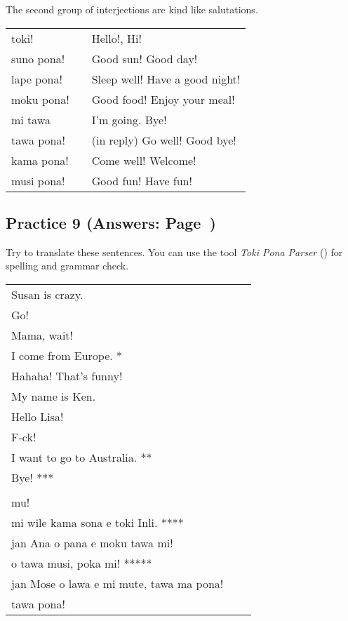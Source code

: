 The second group of interjections are kind like salutations.

\begin{supertabular}{p{5,5cm}|ll}
toki! && Hello!, Hi! \\
suno pona! && Good sun! Good day! \\
lape pona! && Sleep well! Have a good night! \\
moku pona! && Good food! Enjoy your meal! \\
mi tawa && I'm going. Bye! \\
tawa pona! && (in reply) Go well! Good bye! \\
kama pona! && Come well! Welcome! \\
musi pona! && Good fun! Have fun! \\
\end{supertabular}  
%
\subsection*{Practice 9 (Answers: Page~\pageref{'gender_unofficial_words_etc'})}
%
Try to translate these sentences. 
You can use the tool \textit{Toki Pona Parser} (\cite{www:rowa:02}) for spelling and grammar check. 

\begin{supertabular}{p{5,5cm}|ll}
Susan is crazy. &&   \\ %
Go!  &&  \\ %
Mama, wait!  &&  \\ %
I come from Europe. * &&  \\ %
Hahaha! That's funny!  &&  \\ %
My name is Ken. &&  \\  %
Hello Lisa!  && \\  %
F-ck!  &&   \\ %
I want to go to Australia. **  &&  \\  %
Bye! *** &&   \\ %
 && \\ %
mu! &&   \\ %
mi wile kama sona e toki Inli. **** &&  \\ %
jan Ana o pana e moku tawa mi!  &&  \\ %
o tawa musi, poka mi! ***** &&  \\ %
jan Mose o lawa e mi mute, tawa ma pona! &&   \\ %
tawa pona!  &&   \\ %
\end{supertabular} 

